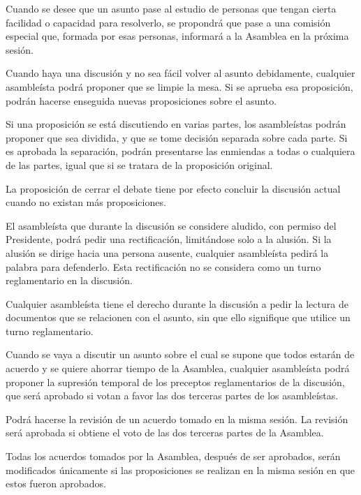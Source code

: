 \article
Cuando se desee que un asunto pase al estudio de personas que tengan cierta facilidad o capacidad para resolverlo, se propondrá que pase a una comisión especial que, formada por esas personas, informará a la Asamblea en la próxima sesión.

\article
Cuando haya una discusión y no sea fácil volver al asunto debidamente, cualquier asambleísta podrá proponer que se limpie la mesa. Si se aprueba esa proposición, podrán hacerse enseguida nuevas proposiciones sobre el asunto.

\article
Si una proposición se está discutiendo en varias partes, los asambleístas podrán proponer que sea dividida, y que se tome decisión separada sobre cada parte. Si es aprobada la separación, podrán presentarse las enmiendas a todas o cualquiera de las partes, igual que si se tratara de la proposición original.

\article
La proposición de cerrar el debate tiene por efecto concluir la discusión actual cuando no existan más proposiciones.


\article
El asambleísta que durante la discusión se considere aludido, con permiso del Presidente, podrá pedir una rectificación, limitándose solo a la alusión. Si la alusión se dirige hacia una persona ausente, cualquier asambleísta pedirá la palabra para defenderlo. Esta rectificación no se considera como un turno reglamentario en la discusión.

\article
Cualquier asambleísta tiene el derecho durante la discusión a pedir la lectura de documentos que se relacionen con el asunto, sin que ello signifique que utilice un turno reglamentario.

\article
Cuando se vaya a discutir un asunto sobre el cual se supone que todos estarán de acuerdo y se quiere ahorrar tiempo de la Asamblea, cualquier asambleísta podrá proponer la supresión temporal de los preceptos reglamentarios de la discusión, que será aprobado si votan a favor las dos terceras partes de los asambleístas.

\article
Podrá hacerse la revisión de un acuerdo tomado en la misma sesión. La revisión será aprobada si obtiene el voto de las dos terceras partes de la Asamblea.

\article
Todas los acuerdos tomados por la Asamblea, después de ser aprobados, serán modificados únicamente si las proposiciones se realizan en la misma sesión en que estos fueron aprobados.

